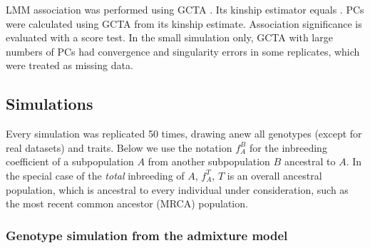\documentclass[9pt,lineno]{elife}
\newcommand{\f}[2]{f^{#1}_{#2}}
\newcommand{\ft}[1][j]{f_{#1}^T}
\begin{document}
LMM association was performed using GCTA \citep{yang_gcta:_2011,yang_advantages_2014}.
Its kinship estimator equals .
PCs were calculated using GCTA from its kinship estimate.
Association significance is evaluated with a score test.
In the small simulation only, GCTA with large numbers of PCs had convergence and singularity errors in some replicates, which were treated as missing data.

\subsection{Simulations}

Every simulation was replicated 50 times, drawing anew all genotypes (except for real datasets) and traits.
Below we use the notation $\f{B}{A}$ for the inbreeding coefficient of a subpopulation $A$ from another subpopulation $B$ ancestral to $A$.
In the special case of the \textit{total} inbreeding of $A$, $\ft[A]$, $T$ is an overall ancestral population, which is ancestral to every individual under consideration, such as the most recent common ancestor (MRCA) population.

\subsubsection{Genotype simulation from the admixture model}

\label{sec:methods-admix}
\end{document}
